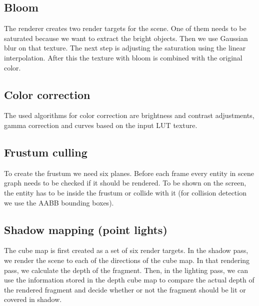 \documentclass[12pt, english]{article}
\begin{document}
\subsection{Bloom}
The renderer creates two render targets for the scene. One of them needs to be
saturated because we want to extract the bright objects. Then we use Gaussian
blur on that texture. The next step is adjusting the saturation using the
linear interpolation. After this the texture with bloom is combined with the
original color.

\subsection{Color correction}
The used algorithms for color correction are brightness and contrast adjustments, gamma correction and curves based on the input LUT texture.

\subsection{Frustum culling}
To create the frustum we need six planes. Before each frame every entity in
scene graph needs to be checked if it should be rendered. To be shown on the
screen, the entity has to be inside the frustum or collide with it (for
collision detection we use the AABB bounding boxes).

\subsection{Shadow mapping (point lights)}
The cube map is first created as a set of six render targets. In the shadow pass, we render the scene to each of the directions of the cube map. In that rendering pass, we calculate the depth of the fragment. Then, in the lighting pass, we can use the information stored in the depth cube map to compare the actual depth of the rendered fragment and decide whether or not the fragment should be lit or covered in shadow.

\end{document}
